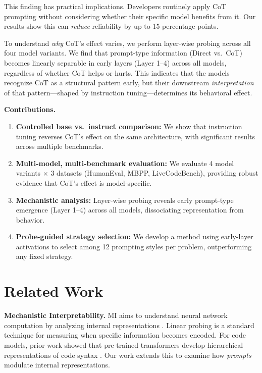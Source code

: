 \documentclass{article}
\begin{document}
This finding has practical implications. Developers routinely apply CoT prompting without considering whether their specific model benefits from it. Our results show this can \emph{reduce} reliability by up to 15 percentage points.

To understand \emph{why} CoT's effect varies, we perform layer-wise probing across all four model variants. We find that prompt-type information (Direct vs.\ CoT) becomes linearly separable in early layers (Layer 1--4) across all models, regardless of whether CoT helps or hurts. This indicates that the models recognize CoT as a structural pattern early, but their downstream \emph{interpretation} of that pattern---shaped by instruction tuning---determines its behavioral effect.

\textbf{Contributions.}
\begin{enumerate}
    \item \textbf{Controlled base vs.\ instruct comparison:} We show that instruction tuning reverses CoT's effect on the same architecture, with significant results across multiple benchmarks.
    \item \textbf{Multi-model, multi-benchmark evaluation:} We evaluate 4 model variants $\times$ 3 datasets (HumanEval, MBPP, LiveCodeBench), providing robust evidence that CoT's effect is model-specific.
    \item \textbf{Mechanistic analysis:} Layer-wise probing reveals early prompt-type emergence (Layer 1--4) across all models, dissociating representation from behavior.
    \item \textbf{Probe-guided strategy selection:} We develop a method using early-layer activations to select among 12 prompting styles per problem, outperforming any fixed strategy.
\end{enumerate}

\section{Related Work}

\textbf{Mechanistic Interpretability.} MI aims to understand neural network computation by analyzing internal representations \citep{elhage2022toy, olah2020zoom}. Linear probing \citep{alain2016understanding} is a standard technique for measuring when specific information becomes encoded. For code models, prior work showed that pre-trained transformers develop hierarchical representations of code syntax \citep{wan2022they}. Our work extends this to examine how \emph{prompts} modulate internal representations.
\end{document}
